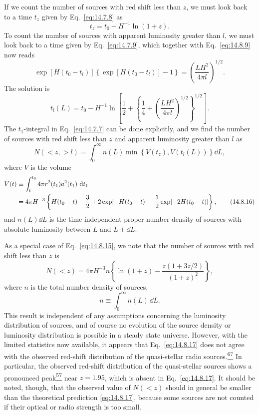 If we count the number of sources with red shift less than \(z\), we must
look back to a time \(t_z\) given by Eq.~\eqref{eq:14.7.8} as
\begin{equation}
  t_z=t_0-H^{-1}\ln(1+z).
  \tag{14.8.13}\label{eq:14.8.13}
\end{equation}
To count the number of sources with apparent luminosity greater than \(l\),
we must look back to a time given by Eq.~\eqref{eq:14.7.9}, which together
with Eq.~\eqref{eq:14.8.9} now reads
\[
  \exp[H(t_0-t_l)]
  \left\{
    \exp[H(t_0-t_l)]-1
  \right\}
  =
  \left(
    \frac{LH^2}{4\pi l}
  \right)^{1/2}.
\]
The solution is
\begin{equation}
  t_l(L)
  =
  t_0
  -
  H^{-1}
  \ln
  \left[
    \frac12
    +
    \left\{
      \frac14
      +
      \left(
        \frac{LH^2}{4\pi l}
      \right)^{1/2}
    \right\}^{1/2}
  \right].
  \tag{14.8.14}\label{eq:14.8.14}
\end{equation}
The \(t_1\)-integral in Eq.~\eqref{eq:14.7.7} can be done explicitly, and
we find the number of sources with red shift less than \(z\) and apparent
luminosity greater than \(l\) as
\begin{equation}
  N(<z,>l)
  =
  \int_0^\infty
  n(L)
  \min\!\left\{
    V(t_z),V(t_l(L))
  \right\}
  \dd L,
  \tag{14.8.15}\label{eq:14.8.15}
\end{equation}
where \(V\) is the volume
\begin{align}
  V(t)
  &\equiv
  \int_t^{t_0}
  4\pi r^2(t_1)a^2(t_1)\,\mathop{}\!\mathrm{d} t_1
  \notag\\
  &=
  4\pi H^{-3}
  \left\{
    H(t_0-t)
    -\frac32
    +2\exp[-H(t_0-t)]
    -\frac12\exp[-2H(t_0-t)]
  \right\},
  \tag{14.8.16}\label{eq:14.8.16}
\end{align}
and \(n(L)\dd L\) is the time-independent proper number density of sources
with absolute luminosity between \(L\) and \(L+\dd L\).

As a special case of Eq.~\eqref{eq:14.8.15}, we note that the number of
sources with red shift less than \(z\) is
\begin{equation}
  N(<z)
  =
  4\pi H^{-3}n
  \left\{
    \ln(1+z)
    -
    \frac{z(1+3z/2)}{(1+z)^2}
  \right\},
  \tag{14.8.17}\label{eq:14.8.17}
\end{equation}
where \(n\) is the total number density of sources,
\[
  n\equiv\int_0^\infty n(L)\,\dd L.
\]
This result is independent of any assumptions concerning the luminosity
distribution of sources, and of course no evolution of the source density
or luminosity distribution is possible in a steady state universe. However,
with the limited statistics now available, it appears that
Eq.~\eqref{eq:14.8.17} does not agree with the observed red-shift
distribution of the quasi-stellar radio
sources.\hyperref[ch14-ref-67]{\textsuperscript{67}} In particular, the
observed red-shift distribution of the quasi-stellar sources shows a
pronounced peak\hyperref[ch14-ref-57]{\textsuperscript{57}} near \(z=1.95\),
which is absent in Eq.~\eqref{eq:14.8.17}. It should be noted, though, that
the observed value of \(N(<z)\) should in general be smaller than the
theoretical prediction \eqref{eq:14.8.17}, because some sources are not
counted if their optical or radio strength is too small.

